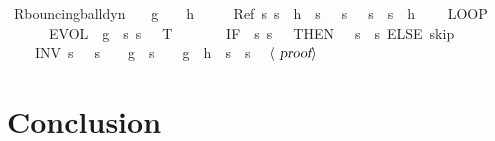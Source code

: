 \documentclass[envcountsame]{llncs}
\begin{document}
\begin{example}
\begin{isabellebody}
\isanewline
{}\isamarkupfalse%
\ R{\isacharunderscore}bouncing{\isacharunderscore}ball{\isacharunderscore }dyn{\isacharcolon}\isanewline
\ \ \ {\isachardoublequoteopen}g\ {\isacharless}\ {}{\isachardoublequoteclose}\ \ {\isachardoublequoteopen}h\ {\isasymge}\ {}{\isachardoublequoteclose}\isanewline
\ \ \ {\isachardoublequoteopen}Ref\ {\isasymlceil}{\isasymlambda}s{\isachardot}\ s{\isachardollar}{}\ {\isacharequal}\ h\ {\isasymand}\ s{\isachardollar}{}\ {\isacharequal}\ {}{\isasymrceil}\ {\isasymlceil}{\isasymlambda}s{\isachardot}\ {}\ {\isasymle}\ s{\isachardollar}{}\ {\isasymand}\ s{\isachardollar}{}\ {\isasymle}\ h{\isasymrceil}\ {\isasymge}\ \isanewline
\ \ {\isacharparenleft}LOOP\ \isanewline
\ \ \ \ \ \ {\isacharparenleft}{\isacharparenleft}EVOL\ {\isacharparenleft}{\isasymphi}\ g{\isacharparenright}\ {\isacharparenleft}{\isasymlambda}\ s{\isachardot}\ s{\isachardollar}{}\ {\isasymge}\ {}{\isacharparenright}\ T{\isacharparenright}{\isacharsemicolon}\isanewline
\ \ \ \ \ \ \ {\isacharparenleft}IF\ {\isacharparenleft}{\isasymlambda}\ s{\isachardot}\ s{\isachardollar}{}\ {\isacharequal}\ {}{\isacharparenright}\ THEN\ {\isacharparenleft}{}\ {\isacharcolon}{\isacharcolon}{\isacharequal}\ {\isacharparenleft}{\isasymlambda}s{\isachardot}\ {\isacharminus}\ s{\isachardollar}{}{\isacharparenright}{\isacharparenright}\ ELSE\ skip{\isacharparenright}{\isacharparenright}\ \isanewline
\ \ \ \ INV\ {\isacharparenleft}{\isasymlambda}s{\isachardot}\ {}\ {\isasymle}\ s{\isachardollar}{}\ {\isasymand}\ {}\ {\isasymcdot}\ g\ {\isasymcdot}\ s{\isachardollar}{}\ {\isacharequal}\ {}\ {\isasymcdot}\ g\ {\isasymcdot}\ h\ {\isacharplus}\ s{\isachardollar}{}\ {\isasymcdot}\ s{\isachardollar}{}{\isacharparenright}{\isacharparenright}{\isachardoublequoteclose}\isanewline
\ \ $\langle \isa{proof}\rangle$\isanewline
\end{isabellebody}

\end{example}




\section{Conclusion}\label{sec:conclusion}
\end{document}
